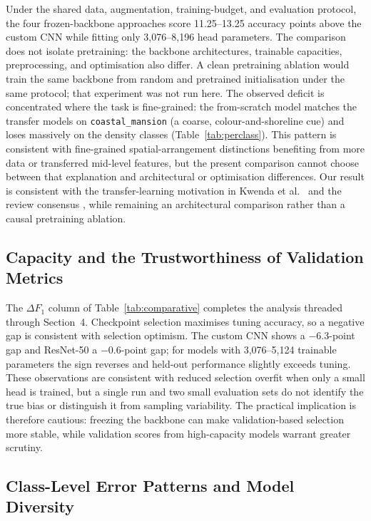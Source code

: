 \documentclass[11pt,twoside,a4paper]{article}
\begin{document}
Under the shared data, augmentation, training-budget, and evaluation protocol,
the four frozen-backbone approaches score 11.25--13.25 accuracy points above
the custom CNN while fitting only 3,076--8,196 head parameters. The comparison
does not isolate pretraining: the backbone architectures, trainable capacities,
preprocessing, and optimisation also differ. A clean pretraining ablation would
train the same backbone from random and pretrained initialisation under the
same protocol; that experiment was not run here. The observed deficit is
concentrated where the task is fine-grained: the from-scratch model matches the
transfer models on
\texttt{coastal\_mansion} (a coarse, colour-and-shoreline cue) and loses
massively on the density classes (Table~\ref{tab:perclass}). This pattern is
consistent with fine-grained spatial-arrangement distinctions benefiting from
more data or transferred mid-level features, but the present comparison cannot
choose between that explanation and architectural or optimisation differences. Our
result is consistent with the transfer-learning motivation in Kwenda et
al.\ \cite{Kwenda2024} and the review consensus \cite{Shoaib2025}, while
remaining an architectural comparison rather than a causal pretraining
ablation.

\subsection{Capacity and the Trustworthiness of Validation Metrics}

The $\Delta F_1$ column of Table~\ref{tab:comparative} completes the analysis
threaded through Section~4. Checkpoint selection maximises tuning accuracy, so
a negative gap is consistent with selection optimism. The custom CNN shows a
$-6.3$-point gap and ResNet-50 a $-0.6$-point gap; for models with
3,076--5,124 trainable parameters the sign reverses and held-out performance
slightly exceeds tuning. These observations are consistent with reduced
selection overfit when only a small head is trained, but a single run and two
small evaluation sets do not identify the true bias or distinguish it from
sampling variability. The practical implication is therefore cautious:
freezing the backbone can make validation-based selection more stable, while
validation scores from high-capacity models warrant greater scrutiny.

\subsection{Class-Level Error Patterns and Model Diversity}
\end{document}
